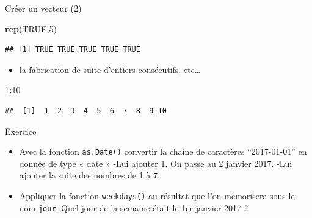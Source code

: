 \documentclass[
  ignorenonframetext,
]{beamer}
\newenvironment{Shaded}{\begin{snugshade}}{\end{snugshade}}
\newcommand{\ConstantTok}[1]{\textcolor[rgb]{0.56,0.35,0.01}{#1}}
\newcommand{\DecValTok}[1]{\textcolor[rgb]{0.00,0.00,0.81}{#1}}
\newcommand{\FunctionTok}[1]{\textcolor[rgb]{0.13,0.29,0.53}{\textbf{#1}}}
\newcommand{\NormalTok}[1]{#1}
\newcommand{\SpecialCharTok}[1]{\textcolor[rgb]{0.81,0.36,0.00}{\textbf{#1}}}
\providecommand{\tightlist}{%
  \setlength{\itemsep}{0pt}\setlength{\parskip}{0pt}}
\begin{document}
\begin{frame}[fragile]{Créer un vecteur (2)}
\begin{Shaded}
\begin{Highlighting}[]
\FunctionTok{rep}\NormalTok{(}\ConstantTok{TRUE}\NormalTok{,}\DecValTok{5}\NormalTok{)}
\end{Highlighting}
\end{Shaded}

\begin{verbatim}
## [1] TRUE TRUE TRUE TRUE TRUE
\end{verbatim}

\normalsize

\begin{itemize}
\tightlist
\item
  la fabrication de suite d'entiers consécutifs, etc\ldots{}
\end{itemize}

\tiny

\begin{Shaded}
\begin{Highlighting}[]
\DecValTok{1}\SpecialCharTok{:}\DecValTok{10}
\end{Highlighting}
\end{Shaded}

\begin{verbatim}
##  [1]  1  2  3  4  5  6  7  8  9 10
\end{verbatim}

\normalsize
\end{frame}

\begin{frame}[fragile]{Exercice}
\protect\hypertarget{exercice}{}
\begin{itemize}
\tightlist
\item
  Avec la fonction \texttt{as.Date()} convertir la chaîne de caractères
  ``2017-01-01'' en donnée de type « date » -Lui ajouter 1. On passe au
  2 janvier 2017. -Lui ajouter la suite des nombres de 1 à 7.
\item
  Appliquer la fonction \texttt{weekdays()} au résultat que l'on
  mémorisera sous le nom \texttt{jour}. Quel jour de la semaine était le
  1er janvier 2017 ?
\end{itemize}
\end{frame}
\end{document}
